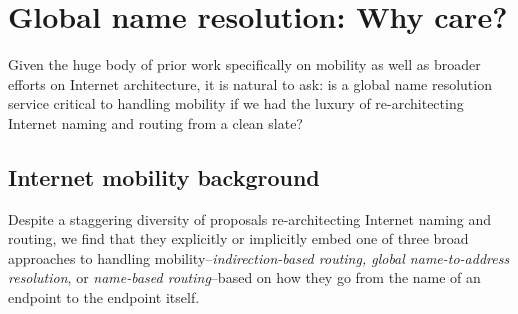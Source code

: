 \vspace{-0.1in}
\section{Global name resolution: Why care?}

Given the huge body of prior work specifically on mobility as well as broader efforts on Internet architecture, it is natural to ask:  is a global name resolution service critical to handling mobility if we had the luxury of re-architecting Internet naming and routing from a clean slate? %



\subsection{Internet mobility background}

\label{sec:bg}




Despite a staggering diversity of proposals re-architecting Internet naming and routing, we find that they explicitly or implicitly embed one of three broad approaches to handling mobility--{\em indirection-based routing, global name-to-address resolution}, or {\em name-based routing}--based on how they go from the name of an endpoint to the endpoint itself.



